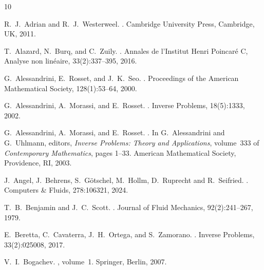 \documentclass[11pt]{article}
\begin{document}
\begin{thebibliography}{10}


R.~J.~Adrian and R.~J.~Westerweel.
.
\newblock Cambridge University Press, Cambridge, UK, 2011.

T.~Alazard, N.~Burq, and C.~Zuily.
.
\newblock Annales de l'Institut Henri Poincaré C, Analyse non linéaire, 33(2):337--395, 2016.

G.~Alessandrini, E.~Rosset, and J.~K.~Seo.
.
\newblock Proceedings of the American Mathematical Society, 128(1):53--64, 2000.


G.~Alessandrini, A.~Morassi, and E.~Rosset.
.
\newblock Inverse Problems, 18(5):1333, 2002.

G.~Alessandrini, A.~Morassi, and E.~Rosset.
.
\newblock In G.~Alessandrini and G.~Uhlmann, editors, {\em Inverse Problems: Theory and Applications}, volume~333 of {\em Contemporary Mathematics}, pages 1--33. American Mathematical Society, Providence, RI, 2003.

J.~Angel, J.~Behrens, S.~G\"otschel, M.~Hollm, D.~Ruprecht and R.~Seifried.
.
\newblock Computers \& Fluids, 278:106321, 2024.


T.~B.~Benjamin and J.~C.~Scott.
.
\newblock Journal of Fluid Mechanics, 92(2):241--267, 1979.


E.~Beretta, C.~Cavaterra, J.~H.~Ortega, and S.~Zamorano.
.
\newblock Inverse Problems, 33(2):025008, 2017.


V.~I.~Bogachev.
, volume~1.
\newblock Springer, Berlin, 2007.


\end{thebibliography}
\end{document}
